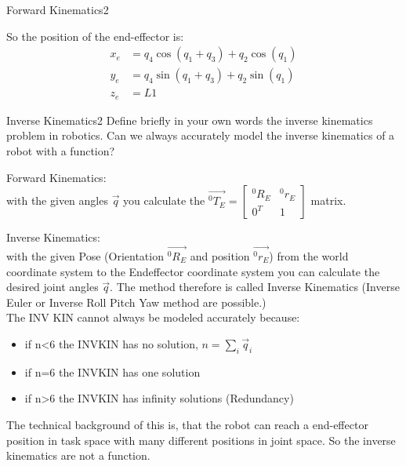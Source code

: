 \begin{questions}
\begin{question}{Forward Kinematics}{2}
\begin{answer}
	So the position of the end-effector is: 
	\begin{equation}
		\begin{split}
			x_e &= q_4\cos(q_1+q_3) + q_2\cos(q_1)\\
			y_e &= q_4\sin(q_1+q_3) + q_2\sin(q_1)\\
			z_e &= L1
		\end{split}
	\end{equation}

	\end{answer}

\end{question}


\begin{question}{Inverse Kinematics}{2}
Define briefly in your own words the inverse kinematics problem in robotics.  
Can we always accurately model the inverse kinematics of a robot with a
function?

\begin{answer}
	Forward Kinematics: \\
	with the given angles $\vec{q}$ you calculate the $\vec{^0T_E} = \begin{bmatrix} ^0R_E & ^0r_E \\ 0^T &1\end{bmatrix}$ matrix. 
	
	Inverse Kinematics:\\
	with the given Pose (Orientation $\vec{^0R_E}$ and position $\vec{^0r_E}$) from the world coordinate system to the Endeffector coordinate system you can calculate the desired joint angles $\vec{q}$. The method therefore is called Inverse Kinematics (Inverse Euler or Inverse Roll Pitch Yaw method are possible.)\\
	
   The INV KIN cannot always be modeled accurately because:
   \begin{itemize}
   	\item if n<6  the INVKIN has no solution, $n=\sum_i \vec{q}_i$ 
   	\item if n=6  the INVKIN has one solution
   	\item if n>6  the INVKIN has infinity solutions (Redundancy)
   \end{itemize}

   The technical background of this is, that the robot can reach a end-effector position in task space with many different positions in joint space. So the inverse kinematics are not a function.


\end{answer}
\end{question}
\end{questions}
